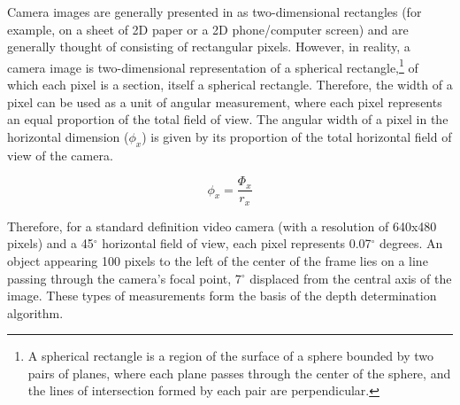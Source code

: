 \documentclass{article}
\begin{document}
Camera images are generally presented in as two-dimensional rectangles (for example, on a sheet of 2D paper or a 2D phone/computer screen) and are generally thought of consisting of rectangular pixels.
However, in reality, a camera image is two-dimensional representation of a spherical rectangle,\footnote{A spherical rectangle is a region of the surface of a sphere bounded by two pairs of planes, where each plane passes through the center of the sphere, and the lines of intersection formed by each pair are perpendicular.} of which each pixel is a section, itself a spherical rectangle.
Therefore, the width of a pixel can be used as a unit of angular measurement, where each pixel represents an equal proportion of the total field of view.
The angular width of a pixel in the horizontal dimension ($\phi_x$) is given by its proportion of the total horizontal field of view of the camera.

\begin{equation}
    \phi_x = \frac{\Phi_x}{r_x}
\end{equation}

Therefore, for a standard definition video camera (with a resolution of 640x480 pixels) and a 45$^{\circ}$ horizontal field of view, each pixel represents 0.07$^\circ$ degrees.
An object appearing 100 pixels to the left of the center of the frame lies on a line passing through the camera's focal point, 7$^\circ$ displaced from the central axis of the image.
These types of measurements form the basis of the depth determination algorithm.
\end{document}
